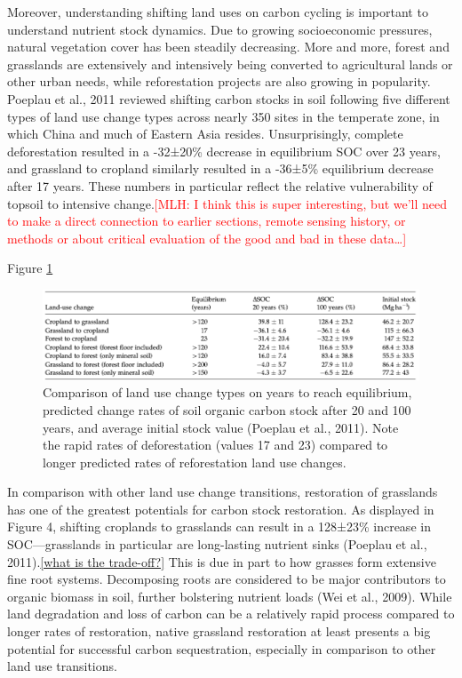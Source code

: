 \documentclass{book}\usepackage{knitr}
\newcommand{\red}[1]{\textcolor{red}{[MLH: #1]}}
\begin{document}
Moreover, understanding shifting land uses on carbon cycling is important to understand nutrient stock dynamics. Due to growing socioeconomic pressures, natural vegetation cover has been steadily decreasing. More and more, forest and grasslands are extensively and intensively being converted to agricultural lands or other urban needs, while reforestation projects are also growing in popularity. Poeplau et al., 2011 reviewed shifting carbon stocks in soil following five different types of land use change types across nearly 350 sites in the temperate zone, in which China and much of Eastern Asia resides. Unsurprisingly, complete deforestation resulted in a -32±20\% decrease in equilibrium SOC over 23 years, and grassland to cropland similarly resulted in a -36±5\% equilibrium decrease after 17 years. These numbers in particular reflect the relative vulnerability of topsoil to intensive change.\red{I think this is super interesting, but we'll need to make a direct connection to earlier sections, remote sensing history, or methods or about critical evaluation of the good and bad in these data\ldots}

Figure \ref{fig:LUC-SOC-Table}

\begin{figure}
\includegraphics[width=\linewidth]{images/land-use/LUC-SOC-Table.png}
\caption{Comparison of land use change types on years to reach equilibrium, predicted change rates of soil organic carbon stock after 20 and 100 years, and average initial stock value (Poeplau et al., 2011). Note the rapid rates of deforestation (values 17 and 23) compared to longer predicted rates of reforestation land use changes.}
\label{fig:LUC-SOC-Table}
\end{figure}

In comparison with other land use change transitions, restoration of grasslands has one of the greatest potentials for carbon stock restoration. As displayed in Figure 4, shifting croplands to grasslands can result in a 128±23\% increase in SOC—grasslands in particular are long-lasting nutrient sinks (Poeplau et al., 2011).\ref{what is the trade-off?} This is due in part to how grasses form extensive fine root systems. Decomposing roots are considered to be major contributors to organic biomass in soil, further bolstering nutrient loads (Wei et al., 2009). While land degradation and loss of carbon can be a relatively rapid process compared to longer rates of restoration, native grassland restoration at least presents a big potential for successful carbon sequestration, especially in comparison to other land use transitions.
\end{document}
